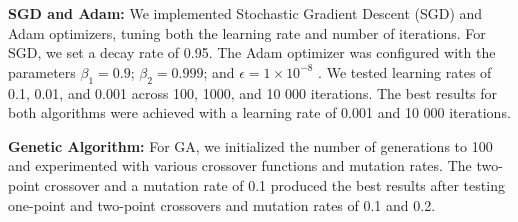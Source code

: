 \documentclass[runningheads]{llncs}
\begin{document}
{\textbf{SGD and Adam: }
We implemented Stochastic Gradient Descent (SGD) and Adam optimizers, tuning both the learning rate and number of iterations. For SGD, we set a decay rate of 0.95. The Adam optimizer was configured with the parameters $\beta_1 = 0.9$; $\beta_2 = 0.999$; and $\epsilon = 1\times10^{-8}$ . We tested learning rates of 0.1, 0.01, and 0.001 across 100, 1000, and 10 000 iterations. The best results for both algorithms were achieved with a learning rate of 0.001 and 10 000 iterations.


\textbf{Genetic Algorithm: }
For GA, we initialized the number of generations to 100 and experimented with various crossover functions and mutation rates. The two-point crossover and a mutation rate of 0.1 produced the best results after testing one-point and two-point crossovers and mutation rates of 0.1 and 0.2.

}
\end{document}

